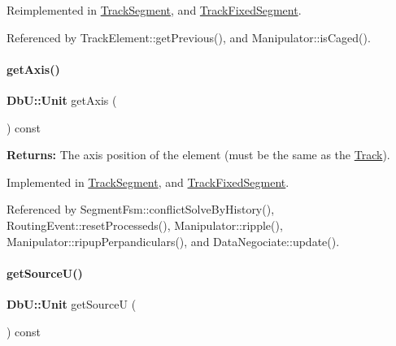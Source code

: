 Reimplemented in \hyperlink{classKite_1_1TrackSegment_a55d6115d84c11ad147f4c38fe372ea24}{Track\+Segment}, and \hyperlink{classKite_1_1TrackFixedSegment_a55d6115d84c11ad147f4c38fe372ea24}{Track\+Fixed\+Segment}.



Referenced by Track\+Element\+::get\+Previous(), and Manipulator\+::is\+Caged().

\mbox{\label{classKite_1_1TrackElement_ac492fb5399691d81c31547db6b56fd03}} 
\paragraph{\texorpdfstring{get\+Axis()}{getAxis()}}
{\footnotesize\ttfamily \textbf{ Db\+U\+::\+Unit} get\+Axis (\begin{DoxyParamCaption}{ }\end{DoxyParamCaption}) const\hspace{0.3cm}{\ttfamily [pure virtual]}}

{\bfseries Returns\+:} The axis position of the element (must be the same as the \hyperlink{classKite_1_1Track}{Track}). 

Implemented in \hyperlink{classKite_1_1TrackSegment_ab5b5aaa5b318369feee6003dbad039c2}{Track\+Segment}, and \hyperlink{classKite_1_1TrackFixedSegment_ab5b5aaa5b318369feee6003dbad039c2}{Track\+Fixed\+Segment}.



Referenced by Segment\+Fsm\+::conflict\+Solve\+By\+History(), Routing\+Event\+::reset\+Processeds(), Manipulator\+::ripple(), Manipulator\+::ripup\+Perpandiculars(), and Data\+Negociate\+::update().

\mbox{\label{classKite_1_1TrackElement_ad521ffba761b0e81b7b81b99d62f76f9}} 
\paragraph{\texorpdfstring{get\+Source\+U()}{getSourceU()}}
{\footnotesize\ttfamily \textbf{ Db\+U\+::\+Unit} get\+SourceU (\begin{DoxyParamCaption}{ }\end{DoxyParamCaption}) const\hspace{0.3cm}{\ttfamily [inline]}}


